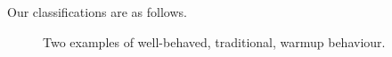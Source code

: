 \documentclass[a4paper,UKenglish]{lipics}
\begin{document}
Our classifications are as follows.

\begin{figure}[tbp]
\caption{Two examples of well-behaved, traditional, warmup behaviour.}
\label{fig:examples:trad}
\end{figure}
\end{document}
